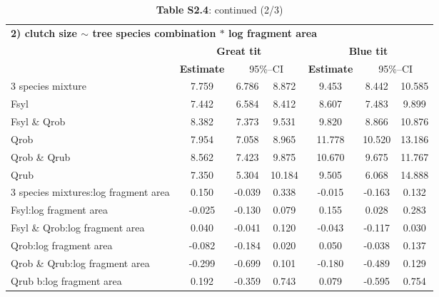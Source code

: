 \documentclass[10pt, twoside]{book} %
\begin{document}
\begin{landscape}
\begin{table}
\begin{center}
\begin{footnotesize}
\begin{tabular}{l c c c c c c}
				\bottomrule
			\end{tabular}\endgroup
		\end{footnotesize}
	\end{center}
\end{table}
\end{landscape}
\clearpage



\clearpage
\thispagestyle{plain}
\begin{landscape}
	\begin{table}
		\begin{center}
			\begin{footnotesize}
				\caption*{\textbf{Table S2.4}: continued (2/3)}
				
				\begingroup
				\setlength{\tabcolsep}{10pt} %
				\renewcommand{\arraystretch}{1.5} %
				\begin{tabular}{l c c c c cc}
					\toprule
					\multicolumn{7}{l}{\textbf{2) clutch size $\sim$ tree species combination $\ast$ log fragment area}}\\
					& \multicolumn{3}{c}{\textbf{Great tit}} & \multicolumn{3}{c}{\textbf{Blue tit}}\\
					\cmidrule(lr){2-4}\cmidrule(lr){5-7}
					
					& \textbf{Estimate} & \multicolumn{2}{c}{95\%--CI} & \textbf{Estimate} & \multicolumn{2}{c}{95\%--CI} \\
					\cmidrule(lr){2-7}
					
				3 species mixture &7.759 & 6.786 & 8.872 & 	9.453 & 8.442 & 10.585\\
				Fsyl & 7.442 & 6.584 & 8.412 & 	8.607 & 7.483 & 9.899\\
				Fsyl \& Qrob &8.382 & 7.373 & 9.531 & 	9.820 & 8.866 & 10.876\\
				Qrob &7.954 & 7.058 & 8.965 & 	11.778 & 10.520 & 13.186\\
				Qrob \& Qrub & 8.562 & 7.423 & 9.875 & 	10.670 & 9.675 & 11.767\\
				Qrub & 7.350 & 5.304 & 10.184 & 	9.505 & 6.068 & 14.888\\
				\cline{1-7}
				3 species mixtures:log fragment area & 0.150 & -0.039 & 0.338 & 	-0.015 & -0.163 & 0.132\\
				Fsyl:log fragment area & -0.025 & -0.130 & 0.079 & 	0.155 & 0.028 & 0.283\\
				Fsyl \& Qrob:log fragment area &0.040 & -0.041 & 0.120 & 	-0.043 & -0.117 & 0.030\\
				Qrob:log fragment area & -0.082 & -0.184 & 0.020 & 	0.050 & -0.038 & 0.137\\
				Qrob \& Qrub:log fragment area & -0.299 & -0.699 & 0.101 & 	-0.180 & -0.489 & 0.129\\
				Qrub b:log fragment area & 0.192 & -0.359 & 0.743 & 	0.079 & -0.595 & 0.754\\
					

\end{tabular}
\end{footnotesize}
\end{center}
\end{table}
\end{landscape}
\end{document}
